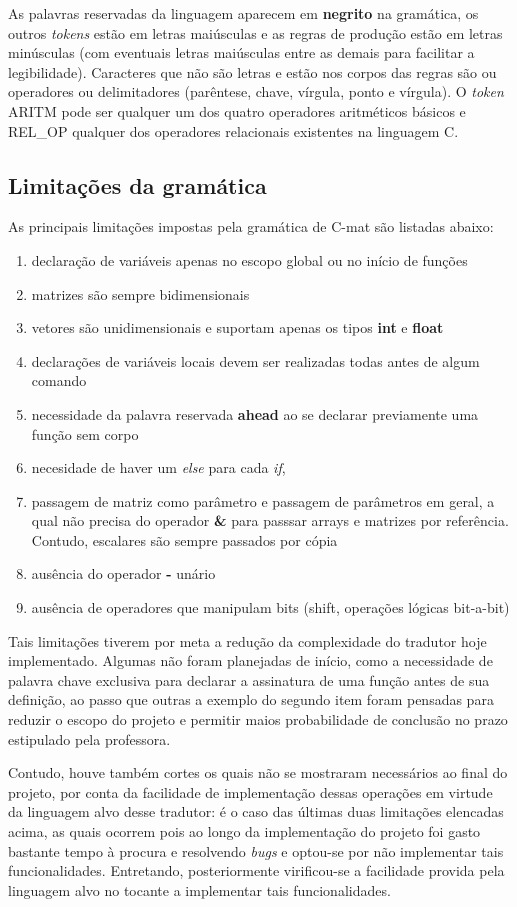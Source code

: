 \documentclass[
	article,			%
	11pt,				%
	oneside,			%
	a4paper,			%
	english,			%
	brazil,				%
	sumario=tradicional
	]{abntex2}
\renewcommand{\it}[1]{\textit{#1}}
\renewcommand{\bf}[1]{\textbf{#1}}
\begin{document}
As palavras reservadas da linguagem aparecem em \bf{negrito} na gramática, os outros \it{tokens} estão em letras maiúsculas e as regras de produção estão em letras minúsculas (com eventuais letras maiúsculas entre as demais para facilitar a legibilidade). Caracteres que não são letras e estão nos corpos das regras são ou operadores ou delimitadores (parêntese, chave, vírgula, ponto e vírgula). O \it{token} ARITM pode ser qualquer um dos quatro operadores aritméticos básicos e REL\_OP qualquer dos operadores relacionais existentes na linguagem C.

\subsection{Limitações da gramática}
As principais limitações impostas pela gramática de C-mat são listadas abaixo:
\begin{enumerate}
	\item declaração de variáveis apenas no escopo global ou no início de funções
	\item matrizes são sempre bidimensionais
	\item vetores são unidimensionais e suportam apenas os tipos \bf{int} e \bf{float}
	\item declarações de variáveis locais devem ser realizadas todas antes de algum comando
	\item necessidade da palavra reservada \bf{ahead} ao se declarar previamente uma função sem corpo
	\item necesidade de haver um \it{else} para cada \it{if},
	\item passagem de matriz como parâmetro e passagem de parâmetros em geral, a qual não precisa do operador \bf{\&} para passsar arrays e matrizes por referência. Contudo, escalares são sempre passados por cópia
	\item ausência do operador \bf{-} unário
	\item ausência de operadores que manipulam bits (shift, operações lógicas bit-a-bit)	
\end{enumerate}
Tais limitações tiverem por meta a redução da complexidade do tradutor hoje implementado. Algumas não foram planejadas de início, como a necessidade de palavra chave exclusiva para declarar a assinatura de uma função antes de sua definição, ao passo que outras a exemplo do segundo item foram pensadas para reduzir o escopo do projeto e permitir maios probabilidade de conclusão no prazo estipulado pela professora. 

Contudo, houve também cortes os quais não se mostraram necessários ao final do projeto, por conta da facilidade de implementação dessas operações em virtude da linguagem alvo desse tradutor: é o caso das últimas duas limitações elencadas  acima, as quais ocorrem pois ao longo da implementação do projeto foi gasto bastante tempo à procura e resolvendo \it{bugs} e optou-se por não implementar tais funcionalidades. Entretando, posteriormente virificou-se a facilidade provida pela linguagem alvo no tocante a implementar tais funcionalidades.
\end{document}
